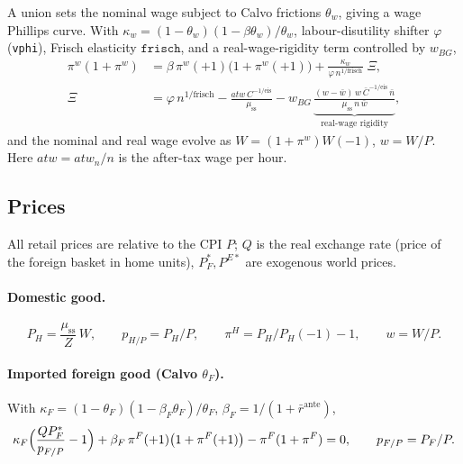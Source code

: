 \documentclass[11pt,a4paper]{article}
\newcommand{\stst}{\mathrm{ss}}
\begin{document}
A union sets the nominal wage subject to Calvo frictions $\theta_w$, giving a
wage Phillips curve. With $\kappa_w=(1-\theta_w)(1-\beta\theta_w)/\theta_w$,
labour-disutility shifter $\varphi$ (\texttt{vphi}), Frisch elasticity
$\texttt{frisch}$, and a real-wage-rigidity term controlled by $w_{BG}$,
\begin{align}
\pi^{w}(1+\pi^{w})
&=\beta\,\pi^{w}(+1)\bigl(1+\pi^{w}(+1)\bigr)
+\frac{\kappa_w}{\varphi\,n^{1/\text{frisch}}}\;\Xi,\\
\Xi &= \varphi\,n^{1/\text{frisch}}
-\frac{atw\,C^{-1/\text{eis}}}{\mu_{\stst}}
- w_{BG}\,\underbrace{\frac{(w-\bar w)\,w\,\bar C^{-1/\text{eis}}\,\bar n}{\mu_{\stst}\,n\,\bar w}}_{\text{real-wage rigidity}},
\end{align}
and the nominal and real wage evolve as $W=(1+\pi^{w})W(-1)$, $w=W/P$. Here
$atw=atw_n/n$ is the after-tax wage per hour.

\subsection{Prices}\label{sec:prices}

All retail prices are relative to the CPI $P$; $Q$ is the real exchange rate
(price of the foreign basket in home units), $P^{*}_{F},P^{E*}$ are exogenous
world prices.

\paragraph{Domestic good.}
\begin{equation}
P_H=\frac{\mu_{\stst}}{Z}\,W,\qquad
p_{H/P}=P_H/P,\qquad
\pi^{H}=P_H/P_H(-1)-1,\qquad w=W/P.
\end{equation}

\paragraph{Imported foreign good (Calvo $\theta_F$).} With
$\kappa_F=(1-\theta_F)(1-\beta_F\theta_F)/\theta_F$, $\beta_F=1/(1+\bar r^{\text{ante}})$,
\begin{equation}
\kappa_F\Bigl(\frac{Q P^{*}_{F}}{p_{F/P}}-1\Bigr)
+\beta_F\,\pi^{F}(+1)\bigl(1+\pi^{F}(+1)\bigr)
-\pi^{F}(1+\pi^{F})=0,\qquad p_{F/P}=P_F/P .
\end{equation}
\end{document}
